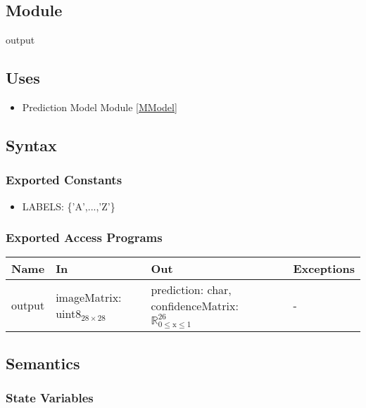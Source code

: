 \documentclass[12pt, titlepage]{article}
\begin{document}
\subsection{Module}

output
\subsection{Uses}

\begin{itemize}
  \item Prediction Model Module \ref{MModel}
\end{itemize}


\subsection{Syntax}

\subsubsection{Exported Constants}

\begin{itemize}
  \item LABELS: \{'A',...,'Z'\}
\end{itemize}

\subsubsection{Exported Access Programs}

\begin{center}
\begin{tabular}{p{2cm} p{4cm} p{4cm} p{2cm}}
\hline
\textbf{Name} & \textbf{In} & \textbf{Out} & \textbf{Exceptions} \\
\hline
output & imageMatrix: uint8$_{28 \times 28}$ & prediction: char, confidenceMatrix: $\mathbb{R}_{\text{0} \leq \text{x} \leq \text{1}}^{26}$ & - \\
\hline
\end{tabular}
\end{center}

\subsection{Semantics}

\subsubsection{State Variables}
\end{document}
